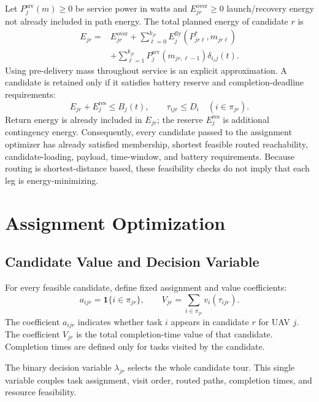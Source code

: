 \documentclass[conference]{IEEEtran}
\begin{document}
Let $P_j^{\mathrm{srv}}(m)\geq0$ be service power in watts and $E_{jr}^{\mathrm{over}}\geq0$ launch/recovery energy not already included in path energy. The total planned energy of candidate $r$ is
\begin{equation}
\begin{split}
E_{jr}={}&E_{jr}^{\mathrm{over}}
+\sum_{\ell=0}^{k_{jr}}E_j^{\mathrm{fly}}(P^*_{jr\ell},m_{jr\ell})\\
&+\sum_{\ell=1}^{k_{jr}}P_j^{\mathrm{srv}}(m_{jr,\ell-1})\delta_{i_\ell j}(t).
\end{split}
\end{equation}
Using pre-delivery mass throughout service is an explicit approximation. A candidate is retained only if it satisfies battery reserve and completion-deadline requirements:
\begin{equation}
E_{jr}+E_j^{\mathrm{res}}\leq B_j(t),\qquad
\tau_{ijr}\leq D_i\quad(i\in\pi_{jr}).
\end{equation}
Return energy is already included in $E_{jr}$; the reserve $E_j^{\mathrm{res}}$ is additional contingency energy. Consequently, every candidate passed to the assignment optimizer has already satisfied membership, shortest feasible routed reachability, candidate-loading, payload, time-window, and battery requirements. Because routing is shortest-distance based, these feasibility checks do not imply that each leg is energy-minimizing.

\section{Assignment Optimization}
\subsection{Candidate Value and Decision Variable}
For every feasible candidate, define fixed assignment and value coefficients:
\begin{equation}
a_{ijr}=\mathbf1\{i\in\pi_{jr}\},\qquad
V_{jr}=\sum_{i\in\pi_{jr}}v_i(\tau_{ijr}).
\end{equation}
The coefficient $a_{ijr}$ indicates whether task $i$ appears in candidate $r$ for UAV $j$. The coefficient $V_{jr}$ is the total completion-time value of that candidate. Completion times are defined only for tasks visited by the candidate.

The binary decision variable $\lambda_{jr}$ selects the whole candidate tour. This single variable couples task assignment, visit order, routed paths, completion times, and resource feasibility.
\end{document}
